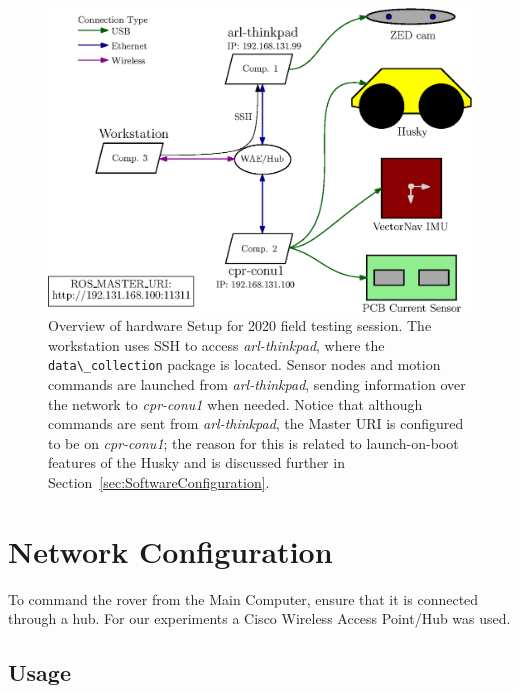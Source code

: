\documentclass[
	12pt, %
]{fphw}
\newcommand{\code}[1]{\colorbox{light-gray}{\lstinline|#1|}}
\begin{document}
\begin{figure}
	\centering
	\includegraphics[scale=1]{figs/SetupOverview.eps}
	\caption{Overview of hardware Setup for 2020 field testing session. The workstation uses SSH to access \emph{arl-thinkpad}, where the \code{data\_collection} package is located. Sensor nodes and motion commands are launched from \emph{arl-thinkpad}, sending information over the network to \emph{cpr-conu1} when needed. Notice that although commands are sent from \emph{arl-thinkpad}, the Master URI is configured to be on \emph{cpr-conu1}; the reason for this is related to launch-on-boot features of the Husky and is discussed further in Section~\ref{sec:SoftwareConfiguration}.}
	\label{fig:SetupOverview}
\end{figure}


\section{Network Configuration}
\label{sec:NetworkConfiguration}


To command the rover from the Main Computer, ensure that it is connected through a hub. For our experiments a Cisco Wireless Access Point/Hub was used.

\subsection{Usage}
\label{subsec:NetworkConfigurationUsage}

\end{document}
